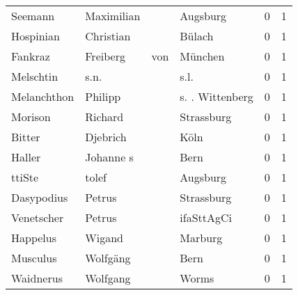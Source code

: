 \begin{center}
\begin{tiny}
\begin{longtabu}{llllrr}
                  Seemann &                         Maximilian &             &                                    Augsburg &          0 &         1 \\
                Hospinian &                          Christian &             &                                      Bülach &          0 &         1 \\
                  Fankraz &                           Freiberg &         von &                                     München &          0 &         1 \\
                Melschtin &                               s.n. &             &                                        s.l. &          0 &         1 \\
              Melanchthon &                            Philipp &             &                             s. . Wittenberg &          0 &         1 \\
                  Morison &                            Richard &             &                                  Strassburg &          0 &         1 \\
                   Bitter &                           Djebrich &             &                                        Köln &          0 &         1 \\
                   Haller &                          Johanne s &             &                                        Bern &          0 &         1 \\
                   ttiSte &                              tolef &             &                                    Augsburg &          0 &         1 \\
               Dasypodius &                             Petrus &             &                                  Strassburg &          0 &         1 \\
               Venetscher &                             Petrus &             &                                  ifaSttAgCi &          0 &         1 \\
                 Happelus &                             Wigand &             &                                     Marburg &          0 &         1 \\
                 Musculus &                           Wolfgäng &             &                                        Bern &          0 &         1 \\
                Waidnerus &                           Wolfgang &             &                                       Worms &          0 &         1 \\

\end{longtabu}
\end{tiny}
\end{center}
